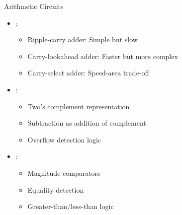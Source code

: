 \begin{frame}{Arithmetic Circuits}
\begin{itemize}
\item {}:
\begin{itemize}
\item Ripple-carry adder: Simple but slow
\item Carry-lookahead adder: Faster but more complex
\item Carry-select adder: Speed-area trade-off
\end{itemize}
\vspace{0.5cm}
\item {}:
\begin{itemize}
\item Two's complement representation
\item Subtraction as addition of complement
\item Overflow detection logic
\end{itemize}
\vspace{0.5cm}
\item {}:
\begin{itemize}
\item Magnitude comparators
\item Equality detection
\item Greater-than/less-than logic
\end{itemize}
\end{itemize}
\end{frame}


